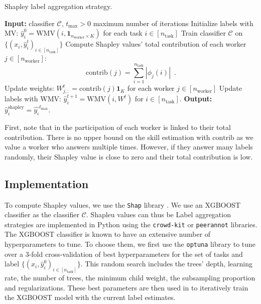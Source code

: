\documentclass{cap2024}
\begin{document}
\begin{algorithm}[tbh]
  \caption{Shapley label aggregation strategy.}\label{alg:shap}
  \begin{algorithmic}[1]
    \State \textbf{Input:} classifier $\mathcal{C}$, $t_{\max}>0$ maximum number of iterations
  \State Initialize labels with MV: $\hat{y}_i^0 = \mathrm{WMV}(i, \mathbf{1}_{n_\text{worker}\times K})$ for each task $i\in [n_\text{task}]$
        \State Train classifier $\mathcal{C}$ on $\{(x_i, \hat{y}_i^t)_{i\in [n_\text{task}]}\}$
        \State Compute Shapley values' total contribution of each worker $j\in [n_\text{worker}]$:
        \[ \mathrm{contrib}(j) = \sum_{i=1}^{n_\text{task}} |\phi_{j}(i)|\enspace. \]
        \State Update weights: $W^t_{j,:} = \mathrm{contrib}(j)\mathbf{1}_K$ for each worker $j\in [n_\text{worker}]$
        \State Update labels with WMV: $\hat{y}_i^{t+1} = \mathrm{WMV}(i, W^{t})$ for $i\in[n_\text{task}]$.
    \EndFor
    \State \textbf{Output:} $\hat{y}_i^\text{shapley} = \hat{y_i}^{t_{\max}}$.
  \end{algorithmic}
  \end{algorithm}

First, note that in  the participation of each worker is linked to their total contribution. There is no upper bound on the skill estimation with $\mathrm{contrib}$ as we value a worker who answers multiple times.
However, if they answer many labels randomly, their Shapley value is close to zero and their total contribution is low.

\subsection{Implementation}
\label{sub:implementation}

To compute Shapley values, we use the \texttt{Shap} library \citep{NIPS2017_7062}.
We use an XGBOOST classifier \citep{chen2016xgboost} as the classifier $\mathcal{C}$.
Shapleu values can thus be
Label aggregation strategies are implemented in Python using the \texttt{crowd-kit} \citep{CrowdKit2023} or \texttt{peerannot} \citep{peerannot} libraries.
The XGBOOST classifier is known to have an extensive number of hyperparameters to tune.
To choose them, we first use the \texttt{optuna} \citep{optuna} library to tune over a $3$-fold cross-validation of best hyperparameters for the set of tasks and label $\{(x_i, \hat{y}_i^0)_{i\in [n_\text{task}]}\}$.
This random search includes the trees' depth, learning rate, the number of trees, the minimum child weight, the subsampling proportion and regularizations. These best parameters are then used in  to iteratively train the XGBOOST model with the current label estimates.
\end{document}

